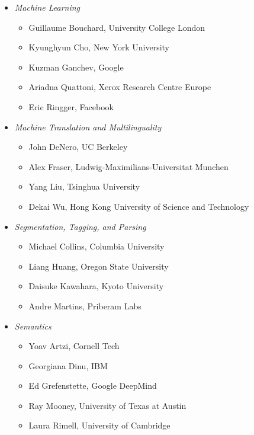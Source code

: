 \begin{itemize}[itemsep=7pt, leftmargin=0cm, label={}]
\begin{itemize}[leftmargin=0.5cm, itemsep=6pt, label={}]
\item \emph{Machine Learning}

\begin{itemize}[nosep, leftmargin=0.5cm, label={}]
\item Guillaume Bouchard, University College London 
 \item   Kyunghyun Cho, New York University 
\item    Kuzman Ganchev, Google 
\item    Ariadna Quattoni, Xerox Research Centre Europe 
\item    Eric Ringger, Facebook 
\end{itemize}

\item \emph{Machine Translation and Multilinguality}

\begin{itemize}[nosep, leftmargin=0.5cm, label={}]
\item John DeNero, UC Berkeley 
\item    Alex Fraser, Ludwig-Maximilians-Universitat Munchen 
\item    Yang Liu, Tsinghua University 
\item    Dekai Wu, Hong Kong University of Science and Technology 
\end{itemize}

\item \emph{Segmentation, Tagging, and Parsing}

\begin{itemize}[nosep, leftmargin=0.5cm, label={}]
\item Michael Collins, Columbia University  
\item    Liang Huang, Oregon State University  
\item    Daisuke Kawahara, Kyoto University  
\item    Andre Martins, Priberam Labs 
\end{itemize}

\item \emph{Semantics}

\begin{itemize}[nosep, leftmargin=0.5cm, label={}]
\item Yoav Artzi, Cornell Tech 
\item    Georgiana Dinu, IBM 
\item    Ed Grefenstette, Google DeepMind 
\item    Ray Mooney, University of Texas at Austin 
\item    Laura Rimell, University of Cambridge 
\end{itemize}


\end{itemize}
\end{itemize}

